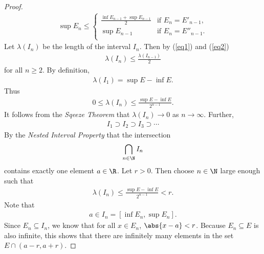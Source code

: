 \documentclass{article}
\begin{document}
\begin{proof}
\begin{align}
      \label{eq2}
      \sup E_n \leq \begin{cases}
         \frac{\inf E_{n-1} + \sup E_{n-1}}{2} &\text{if }E_n = E'_{n-1},\\
         \sup E_{n-1} &\text{if }E_n = E''_{n-1}.\\
      \end{cases}
   \end{align}
   Let $\lambda(I_n)$ be the length of the interval $I_n$. 
   Then by (\ref{eq1}) and (\ref{eq2})
   \begin{align*}
      \lambda(I_n) \leq \frac{\lambda (I_{n-1})}{2}
   \end{align*}
   for all $n\geq 2$.
   By definition,
   \begin{align*}
      \lambda(I_1) = \sup E - \inf E.
   \end{align*}
   Thus 
   \begin{align*}
      0 \leq \lambda(I_n) \leq \frac{\sup E - \inf E}{2^{n-1}}.
   \end{align*}
   It follows from the \emph{Sqeeze Theorem} that $\lambda(I_n)\to 0$ as $n\to\infty$.
   Further,
   \begin{align*}
      I_1 \supset I_2 \supset I_3 \supset \cdots 
   \end{align*}
   By the \emph{Nested Interval Property} that the intersection
   \begin{align*}
      \bigcap_{n\in\N} I_n
   \end{align*}
   contains exactly one element $a\in\R$. Let $r>0$. Then choose $n\in\N$ large enough
   such that
   \begin{align*}
      \lambda(I_n)\leq \frac{\sup E - \inf E}{2^{n-1}} < r.
   \end{align*}
   Note that
   \begin{align*}
      a \in I_n = [\inf E_n, \sup E_n].
   \end{align*}
   Since $E_n\subseteq I_n$, we know that for all $x\in E_n$, $\abs{x-a}<r$.
   Because $E_n\subseteq E$ is also infinite, this shows that there are infinitely many elements in
   the set $E\cap(a-r, a+r)$.
\end{proof}
\end{document}
